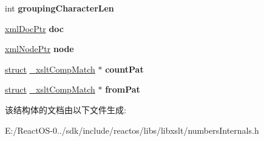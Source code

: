 \begin{DoxyCompactItemize}
int {\bfseries grouping\+Character\+Len}
\item 
\mbox{\label{struct__xslt_number_data_adedee94d02502e5b1b9595657bbca98f}} 
\hyperlink{struct__xml_doc}{xml\+Doc\+Ptr} {\bfseries doc}
\item 
\mbox{\label{struct__xslt_number_data_a1989d529458248bd2aa96c817d60356d}} 
\hyperlink{struct__xml_node}{xml\+Node\+Ptr} {\bfseries node}
\item 
\mbox{\label{struct__xslt_number_data_ae32f32001a93688eb2281b03e0cad9da}} 
\hyperlink{interfacestruct}{struct} \hyperlink{struct__xslt_comp_match}{\+\_\+xslt\+Comp\+Match} $\ast$ {\bfseries count\+Pat}
\item 
\mbox{\label{struct__xslt_number_data_afc34c0e5e66aa9483ba0e9a125421b00}} 
\hyperlink{interfacestruct}{struct} \hyperlink{struct__xslt_comp_match}{\+\_\+xslt\+Comp\+Match} $\ast$ {\bfseries from\+Pat}
\end{DoxyCompactItemize}


该结构体的文档由以下文件生成\+:\begin{DoxyCompactItemize}
\item 
E\+:/\+React\+O\+S-\/0../sdk/include/reactos/libs/libxslt/numbers\+Internals.\+h\end{DoxyCompactItemize}
